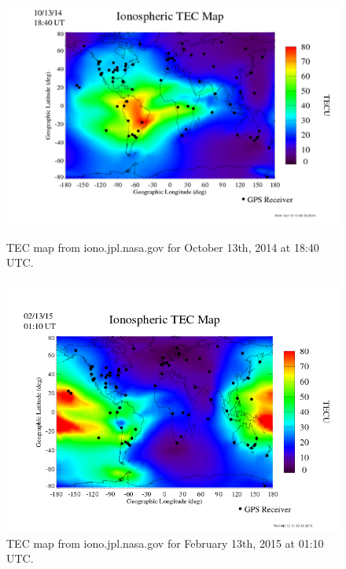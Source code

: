 \begin{figure}[htb]
\centering
\begin{minipage}[b]{0.48\textwidth}
\centering
\includegraphics[width=0.95\linewidth]{Ionosphere/figures/TEC_map_20141013_18-40UT.png}
\caption{TEC map from iono.jpl.nasa.gov for October 13th, 2014 at 18:40 UTC.  }
\label{Fig:fall_tec_global}
\end{minipage}%
\begin{minipage}[b]{0.02\textwidth}
\hspace{1cm}
\end{minipage}%
\begin{minipage}[b]{0.48\textwidth}
\centering
\includegraphics[width=0.95\linewidth]{Ionosphere/figures/TEC_map_20150213_01-10UT.png}
\caption{TEC map from iono.jpl.nasa.gov for February 13th, 2015 at 01:10 UTC.  }
\label{Fig:winter_tec_global}
\end{minipage}
\end{figure}

